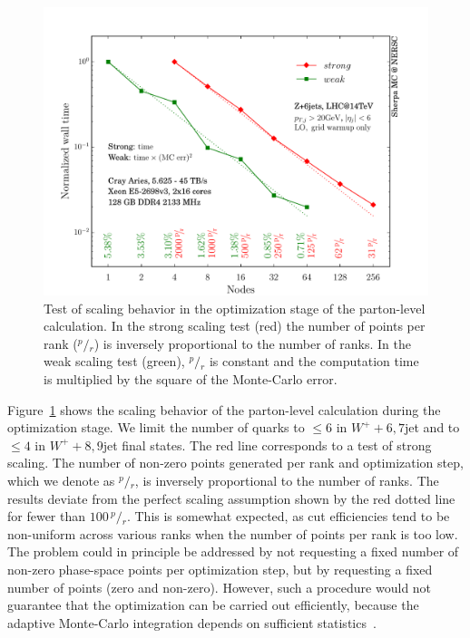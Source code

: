 \documentclass[aps,prd,twocolumn,fleqn,superscriptaddress,groupedaddress,nofootinbib,preprintnumbers]{revtex4}
\begin{document}
\begin{figure}[t]
    \centering
    \includegraphics[width=\linewidth]{fig/int_scale.pdf}
    \caption{Test of scaling behavior in the optimization stage
      of the parton-level calculation. In the strong scaling test
      (red) the number of points per rank ($^p\!/\!_r$) is
      inversely proportional to the number of ranks. In the weak
      scaling test (green), $^p\!/\!_r$ is constant and the computation
      time is multiplied by the square of the Monte-Carlo error.}
    \label{fig:int_scaling}
\end{figure}
Figure~\ref{fig:int_scaling} shows the scaling behavior of the
parton-level calculation during the optimization stage.
We limit the number of quarks to $\le6$ in $W^++6,7$jet
and to $\le4$ in $W^++8,9$jet final states. The red
line corresponds to a test of strong scaling. The number of
non-zero points generated per rank and optimization step, which we
denote as $^p\!/\!_r$, is inversely proportional to the number of ranks.
The results deviate from the perfect scaling assumption shown
by the red dotted line for fewer than $100\,^p\!/\!_r$. This is
somewhat expected, as cut efficiencies tend to be non-uniform
across various ranks when the number of points per rank is too low.
The problem could in principle be addressed by not requesting
a fixed number of non-zero phase-space points per optimization step,
but by requesting a fixed number of points (zero and non-zero).
However, such a procedure would not guarantee that the optimization
can be carried out efficiently, because the adaptive Monte-Carlo
integration depends on sufficient statistics~\cite{Lepage:1977sw,Kleiss:1994qy}.
\end{document}
